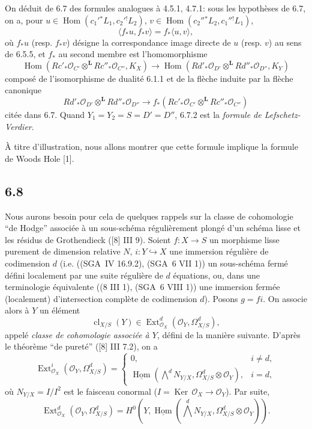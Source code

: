 \documentclass[11pt]{article}
\providecommand{\cO}{\mathcal{O}}
\DeclareMathOperator{\Hom}{Hom}
\DeclareMathOperator{\Ext}{Ext}
\providecommand{\Ker}{\operatorname{Ker}}
\providecommand{\cl}{\operatorname{cl}}
\providecommand{\Hom}{\operatorname{Hom}}
\providecommand{\Ker}{\operatorname{Ker}}
\providecommand{\Ker}{\operatorname{Ker}}
\providecommand{\cl}{\operatorname{cl}}
\providecommand{\Hom}{\operatorname{Hom}}
\providecommand{\cl}{\operatorname{cl}}
\begin{document}
On déduit de 6.7 des formules analogues à 4.5.1, 4.7.1: sous les hypothèses de 6.7, on a, pour $u\in\Hom(c_1'{}^*L_1,c_2'{}^!L_2)$, $v\in\Hom(c_2''{}^*L_2,c_1''{}^!L_1)$,
\begin{equation}
\tag{6.7.2}
\langle f_*u,f_*v\rangle=f_*\langle u,v\rangle,
\end{equation}
où $f_*u$ (resp. $f_*v$) désigne la correspondance image directe de $u$ (resp. $v$) au sens de 6.5.5, et $f_*$ au second membre est l'homomorphisme
\begin{equation}
\tag{6.7.3}
\Hom(Rc'_*\cO_{C'}\otimes^{\mathbf L}Rc''_*\cO_{C''},K_X)
\longrightarrow
\Hom(Rd'_*\cO_{D'}\otimes^{\mathbf L}Rd''_*\cO_{D''},K_Y)
\end{equation}
composé de l'isomorphisme de dualité 6.1.1 et de la flèche induite par la flèche canonique
\[
Rd'_*\cO_{D'}\otimes^{\mathbf L}Rd''_*\cO_{D''}\longrightarrow f_*(Rc'_*\cO_{C'}\otimes^{\mathbf L}Rc''_*\cO_{C''})
\]
citée dans 6.7. Quand $Y_1=Y_2=S=D'=D''$, 6.7.2 est la \emph{formule de Lefschetz-Verdier}.

À titre d'illustration, nous allons montrer que cette formule implique la formule de Woods Hole [1].

\subsection*{6.8}
Nous aurons besoin pour cela de quelques rappels sur la classe de cohomologie ``de Hodge'' associée à un sous-schéma régulièrement plongé d'un schéma lisse et les résidus de Grothendieck ([8] III 9). Soient $f:X\to S$ un morphisme lisse purement de dimension relative $N$, $i:Y\hookrightarrow X$ une immersion régulière de codimension $d$ (i.e. ((SGA~IV 16.9.2), (SGA~6 VII 1)) un sous-schéma fermé défini localement par une suite régulière de $d$ équations, ou, dans une terminologie équivalente ((8 III 1), (SGA~6 VIII 1)) une immersion fermée (localement) d'intersection complète de codimension $d$). Posons $g=fi$. On associe alors à $Y$ un élément
\begin{equation}
\tag{6.8.1}
\cl_{X/S}(Y)\in\Ext^d_{\cO_X}(\cO_Y,\Omega^d_{X/S}),
\end{equation}
appelé \emph{classe de cohomologie associée à $Y$}, défini de la manière suivante. D'après le théorème ``de pureté'' ([8] III 7.2), on a
\begin{equation}
\tag{6.8.2}
\Ext^i_{\cO_X}(\cO_Y,\Omega^d_{X/S})=
\begin{cases}
0,& i\ne d,\\
\underline{\Hom}(\bigwedge^d N_{Y/X},\Omega^d_{X/S}\otimes\cO_Y),& i=d,
\end{cases}
\end{equation}
où $N_{Y/X}=I/I^2$ est le faisceau conormal ($I=\Ker\,\cO_X\to\cO_Y$). Par suite,
\begin{equation}
\tag{6.8.3}
\Ext^d_{\cO_X}(\cO_Y,\Omega^d_{X/S})=H^0(Y,\underline{\Hom}(\bigwedge^dN_{Y/X},\Omega^d_{X/S}\otimes\cO_Y)).
\end{equation}
\end{document}
